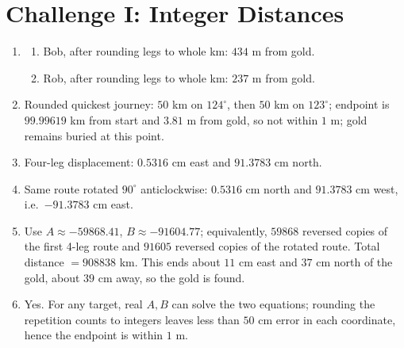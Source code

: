 \documentclass{article}
\begin{document}
\section*{Challenge I: Integer Distances}
\begin{enumerate}
\item
\begin{enumerate}
\item Bob, after rounding legs to whole km: \(434\) m from gold.
\item Rob, after rounding legs to whole km: \(237\) m from gold.
\end{enumerate}

\item Rounded quickest journey: \(50\) km on \(124^\circ\), then \(50\) km on \(123^\circ\); endpoint is \(99.99619\) km from start and \(3.81\) m from gold, so not within \(1\) m; gold remains buried at this point.

\item Four-leg displacement: \(0.5316\) cm east and \(91.3783\) cm north.

\item Same route rotated \(90^\circ\) anticlockwise: \(0.5316\) cm north and \(91.3783\) cm west, i.e.\ \(-91.3783\) cm east.

\item Use \(A\approx -59868.41\), \(B\approx -91604.77\); equivalently, \(59868\) reversed copies of the first 4-leg route and \(91605\) reversed copies of the rotated route. Total distance \(=908838\) km. This ends about \(11\) cm east and \(37\) cm north of the gold, about \(39\) cm away, so the gold is found.

\item Yes. For any target, real \(A,B\) can solve the two equations; rounding the repetition counts to integers leaves less than \(50\) cm error in each coordinate, hence the endpoint is within \(1\) m.
\end{enumerate}
\end{document}
